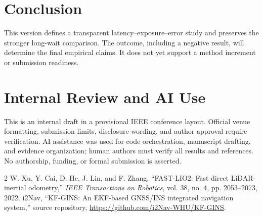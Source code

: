 \documentclass[conference]{IEEEtran}
\begin{document}
\section{Conclusion}
This version defines a transparent latency--exposure--error study and preserves the stronger long-wait comparison. The outcome, including a negative result, will determine the final empirical claims. It does not yet support a method increment or submission readiness.

\section*{Internal Review and AI Use}
This is an internal draft in a provisional IEEE conference layout. Official venue formatting, submission limits, disclosure wording, and author approval require verification. AI assistance was used for code orchestration, manuscript drafting, and evidence organization; human authors must verify all results and references. No authorship, funding, or formal submission is asserted.
\begin{thebibliography}{2}
 W. Xu, Y. Cai, D. He, J. Lin, and F. Zhang, ``FAST-LIO2: Fast direct LiDAR-inertial odometry,'' \emph{IEEE Transactions on Robotics}, vol. 38, no. 4, pp. 2053--2073, 2022.
 i2Nav, ``KF-GINS: An EKF-based GNSS/INS integrated navigation system,'' source repository, \url{https://github.com/i2Nav-WHU/KF-GINS}.
\end{thebibliography}
\end{document}
